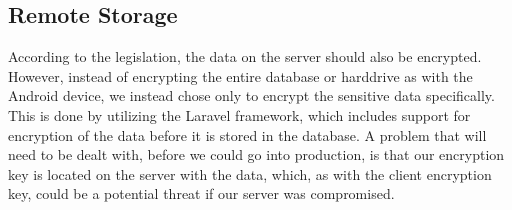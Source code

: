 \subsection{Remote Storage}
\label{sub:remote_storage}

According to the legislation, the data on the server should also be encrypted. However, instead of encrypting the entire database or harddrive as with the Android device, we instead chose only to encrypt the sensitive data specifically. This is done by utilizing the Laravel framework, which includes support for encryption of the data before it is stored in the database. A problem that will need to be dealt with, before we could go into production, is that our encryption key is located on the server with the data, which, as with the client encryption key, could be a potential threat if our server was compromised. 
